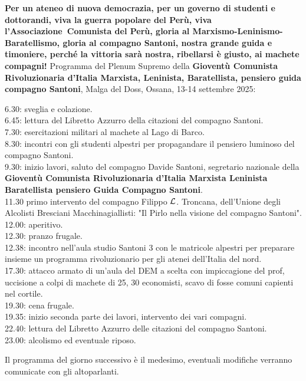 \documentclass{article}
\begin{document}
\center 
{\huge\bf Per un ateneo di nuova democrazia, per un governo di studenti e dottorandi, viva la guerra popolare del Perù, viva l'Associazione\texttrademark\ Comunista del Perù, gloria al Marxismo-Leninismo-Baratellismo, gloria al compagno Santoni, nostra grande guida e timoniere, perché la vittoria sarà nostra, ribellarsi è giusto, ai machete compagni!}
\pagebreak
\center
Programma del Plenum Supremo della {\bf Gioventù Comunista Rivoluzionaria d'Italia Marxista, Leninista, Baratellista, pensiero guida compagno Santoni}, Malga del Doss, Ossana, 13-14 settembre 2025:
\flushleft
\begin{multicols}{2}
    6.30: sveglia e colazione.\\
    6.45: lettura del Libretto Azzurro della citazioni del compagno Santoni.\\
    7.30: esercitazioni militari al machete al Lago di Barco.\\
    8.30: incontri con gli studenti alpestri per propagandare il pensiero luminoso del compagno Santoni.\\
    9.30: inizio lavori, saluto del compagno Davide Santoni, segretario nazionale della {\bf Gioventù Comunista Rivoluzionaria d'Italia Marxista Leninista Baratellista pensiero Guida Compagno Santoni}.\\
    11.30 primo intervento del compagno Filippo $\mathcal{L}$. Troncana, dell'Unione degli Alcolisti Bresciani Macchinagiallisti: "Il Pirlo nella visione del compagno Santoni".\\
    12.00: aperitivo.\\
    12.30: pranzo frugale.\\
    12.38: incontro nell'aula studio Santoni 3 con le matricole alpestri per preparare insieme un programma rivoluzionario per gli atenei dell'Italia del nord.\\
    17.30: attacco armato di un'aula del DEM a scelta con impiccagione del prof, uccisione a colpi di machete di 25, 30 economisti, scavo di fosse comuni capienti nel cortile.\\
    19.30: cena frugale.\\
    19.35: inizio seconda parte dei lavori, intervento dei vari compagni.\\
    22.40: lettura del Libretto Azzurro delle citazioni del compagno Santoni.\\
    23.00: alcolismo ed eventuale riposo.
\end{multicols}
\center
Il programma del giorno successivo è il medesimo, eventuali modifiche verranno comunicate con gli altoparlanti.\\
\end{document}
